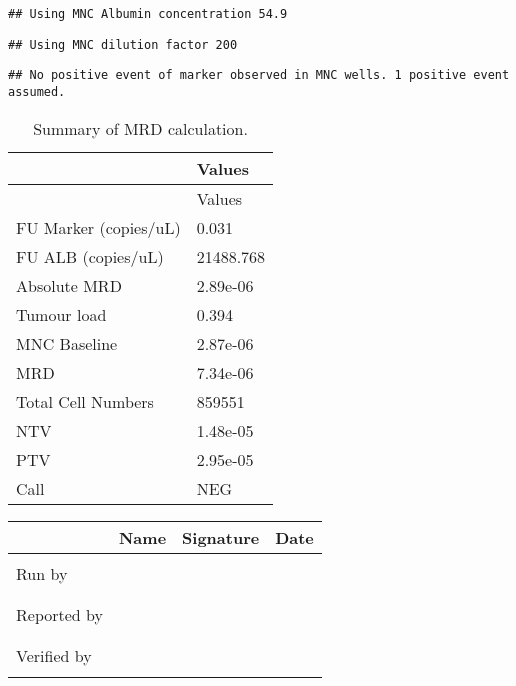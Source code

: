 \documentclass[
  10pt,
]{article}
\begin{document}
\begin{verbatim}
## Using MNC Albumin concentration 54.9
\end{verbatim}

\begin{verbatim}
## Using MNC dilution factor 200
\end{verbatim}

\begin{verbatim}
## No positive event of marker observed in MNC wells. 1 positive event assumed.
\end{verbatim}

\begin{longtable}[]{@{}ll@{}}
\caption{Summary of MRD calculation.}\tabularnewline
\toprule
& Values\tabularnewline
\midrule
\endfirsthead
\toprule
& Values\tabularnewline
\midrule
\endhead
FU Marker (copies/uL) & 0.031\tabularnewline
FU ALB (copies/uL) & 21488.768\tabularnewline
Absolute MRD & 2.89e-06\tabularnewline
Tumour load & 0.394\tabularnewline
MNC Baseline & 2.87e-06\tabularnewline
MRD & 7.34e-06\tabularnewline
Total Cell Numbers & 859551\tabularnewline
NTV & 1.48e-05\tabularnewline
PTV & 2.95e-05\tabularnewline
Call & NEG\tabularnewline
\bottomrule
\end{longtable}

\vspace{2cm}
\begin{tabular}{|p{2cm}|p{4cm}|p{4cm}|p{4cm}|}
\hline
 & Name & Signature & Date\\
\hline
&&&\\
Run by&  &  & \\
&&&\\
\hline
&&&\\
Reported by &  &  & \\
&&&\\
\hline
&&&\\
Verified by &  &  & \\
&&&\\
\hline
\end{tabular}
\end{document}
